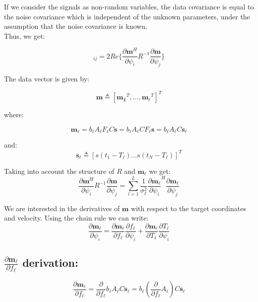 If we consider the signals as non-random variables, the data covariance is equal to the noise covariance which is independent of the unknown parameters, under the assumption that the noise covariance is known. \\
Thus, we get: 

\begin{equation}
[J]_{ij} =	2Re\{\frac{\partial \mathbf{m}^H}{\partial \psi_{i}}R^{-1}\frac{\partial \mathbf{m}}{\partial \psi_{j}}\}
\end{equation}

The data vector is given by:

\begin{equation}
\mathbf{m} \triangleq [\mathbf{m_1}^T,\dots ,\mathbf{m_\ell}^T]^T                                              
\end{equation}

where:

\begin{equation}
\mathbf{m_\ell}=b_\ell A_\ell F_\ell C \mathbf{s}=b_\ell A_\ell C F_\ell \mathbf{s} = b_\ell A_\ell C \mathbf{s_\ell}
\end{equation}


and:
\begin{equation}
\mathbf{s_\ell} \triangleq [s(t_1-T_\ell) \dots s(t_N-T_\ell)]^T                                                           
\end{equation}

Taking into account the structure of $R$ and $\mathbf{m_\ell}$ we get:
\begin{equation}
\frac{\partial \mathbf{m}^H}{\partial \psi_{i}}R^{-1}\frac{\partial \mathbf{m}}{\partial \psi_{j}} = 
\sum_{l=1}^L\frac{1}{\sigma_\ell^2}\frac{\partial \mathbf{m_\ell}}{\partial \psi_i}^H\frac{\partial \mathbf{m_\ell}}{\partial \psi_j}
\end{equation}

We are interested in the derivatives of $\mathbf{m}$ with respect to the target coordinates and velocity. Using the chain rule we can write:
\begin{equation}
\frac{\partial \mathbf{m_\ell}}{\partial \psi_i}=\frac{\partial \mathbf{m_\ell}}{\partial f_\ell}\frac{\partial f_\ell}{\partial \psi_i}+\frac{\partial \mathbf{m_\ell}}{\partial T_\ell}  \frac{\partial T_\ell}{\partial \psi_i}                                                                  
\end{equation}

\subsection{$\frac{\partial \mathbf{m_\ell}}{\partial f_\ell}$ derivation:}
\begin{equation}
\frac{\partial \mathbf{m_\ell}}{\partial f_\ell}=\frac{\partial}{\partial f_\ell} b_\ell A_\ell C \mathbf{s_\ell} = b_\ell ( \frac{\partial}{\partial f_\ell} A_\ell ) C \mathbf{s_\ell}
\end{equation}

